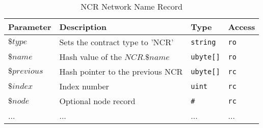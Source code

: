 \begin{table}[H]
\begin{center}
\begin{tabular}{|l|p{7cm}|p{1.5cm}|l|}
      \hline
      Parameter & Description & Type & Access \\
      \hline
      $\$type$ & Sets the contract type to 'NCR' &  \texttt{string} & \texttt{ro} \\
      \hline
      $\$name$ & Hash value of the $NCR.\$name$ & \texttt{ubyte[]} & \texttt{ro} \\
      \hline
      $\$previous$ & Hash pointer to the previous NCR & \texttt{ubyte[]} & \texttt{rc} \\
      \hline
      $\$index$ & Index number & \texttt{uint} & \texttt{rc} \\
      \hline
      $\$node$ & Optional node record & \texttt{\#} & \texttt{rc} \\
      \hline
      ... & ... &  ... &  ... \\
      \hline
  \end{tabular}
\end{center}
\caption{NCR Network Name Record} 
\label{tab:ncr}
\end{table}


